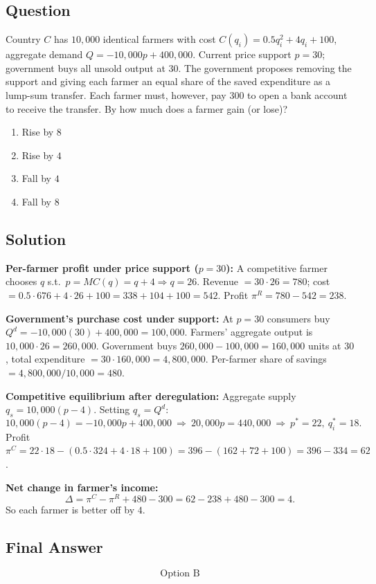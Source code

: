 \documentclass[11pt]{article}
\begin{document}
\subsection*{Question}
Country $C$ has $10{,}000$ identical farmers with cost $C(q_i)=0.5q_i^{2}+4q_i+100$, aggregate demand $Q=-10{,}000p+400{,}000$. Current price support $p=30$; government buys all unsold output at $30$. The government proposes removing the support and giving each farmer an equal share of the saved expenditure as a lump-sum transfer. Each farmer must, however, pay $300$ to open a bank account to receive the transfer. By how much does a farmer gain (or lose)?
\begin{enumerate}[label=(\Alph*)]
\item Rise by $8$
\item Rise by $4$
\item Fall by $4$
\item Fall by $8$
\end{enumerate}

\subsection*{Solution}
\textbf{Per-farmer profit under price support ($p=30$):} A competitive farmer chooses $q$ s.t.\ $p=MC(q)=q+4\Rightarrow q=26$. Revenue $=30\cdot 26=780$; cost $=0.5\cdot 676+4\cdot 26+100=338+104+100=542$. Profit $\pi^{R}=780-542=238$.

\textbf{Government's purchase cost under support:} At $p=30$ consumers buy $Q^{d}=-10{,}000(30)+400{,}000=100{,}000$. Farmers' aggregate output is $10{,}000\cdot 26=260{,}000$. Government buys $260{,}000-100{,}000=160{,}000$ units at $30$, total expenditure $=30\cdot 160{,}000=4{,}800{,}000$. Per-farmer share of savings $=4{,}800{,}000/10{,}000=480$.

\textbf{Competitive equilibrium after deregulation:} Aggregate supply $q_{s}=10{,}000(p-4)$. Setting $q_{s}=Q^{d}$:
\[
10{,}000(p-4)= -10{,}000p+400{,}000\ \Longrightarrow\ 20{,}000p=440{,}000\ \Longrightarrow\ p^{*}=22,\ q^{*}_i=18.
\]
Profit $\pi^{C}=22\cdot 18 -(0.5\cdot 324+4\cdot 18+100)=396-(162+72+100)=396-334=62$.

\textbf{Net change in farmer's income:}
\[
\Delta = \pi^{C}-\pi^{R}+480-300 = 62-238+480-300=4.
\]
So each farmer is better off by $4$.

\subsection*{Final Answer}
\[
\boxed{\text{Option B}}
\]
\end{document}
